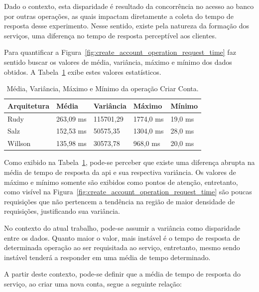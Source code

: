 Dado o contexto, esta disparidade é resultado da concorrência no acesso ao banco por outras operações, as quais impactam diretamente a coleta do tempo de resposta desse experimento.
%
Nesse sentido, existe pela natureza da formação dos serviços, uma diferença no tempo de resposta perceptível aos clientes.

Para quantificar a Figura~\ref{fig:create_account_operation_request_time} faz sentido buscar os valores de média, variância, máximo e mínimo dos dados obtidos.
%
A Tabela~\ref{tab:create_account_operation_request_time} exibe estes valores estatísticos.

\begin{table}[htb!]
\centering
\begin{adjustbox}{max width=\textwidth}
\caption{Média, Variância, Máximo e Mínimo da operação Criar Conta.}
\label{tab:create_account_operation_request_time}
\begin{tabular}{l|l|l|l|l}
\hline \hline
Arquitetura & Média     & Variância & Máximo    & Mínimo  \\ \hline \hline
Rudy        & 263,09 ms & 115701,29 & 1774,0 ms & 19,0 ms \\ \hline
Salz        & 152,53 ms & 50575,35  & 1304,0 ms & 28,0 ms \\ \hline
Willson     & 135,98 ms & 30573,78  & 968,0 ms  & 20,0 ms \\ \hline \hline
\end{tabular}

\end{adjustbox}
\end{table}

Como exibido na Tabela~\ref{tab:create_account_operation_request_time}, pode-se perceber que existe uma diferença abrupta na média de tempo de resposta da \ac{api} e sua respectiva variância.
%
Os valores de máximo e mínimo somente são exibidos como pontos de atenção, entretanto, como visível na Figura~\ref{fig:create_account_operation_request_time} são poucas requisições que não pertencem a tendência na região de maior densidade de requisições, justificando sua variância.

No contexto do atual trabalho, pode-se assumir a variância como disparidade entre os dados.
%
Quanto maior o valor, mais instável é o tempo de resposta de determinada operação ao ser requisitada ao serviço, entretanto, mesmo sendo instável tenderá a responder em uma média de tempo determinado.

A partir deste contexto, pode-se definir que a média de tempo de resposta do serviço, ao criar uma nova conta, segue a seguinte relação:

